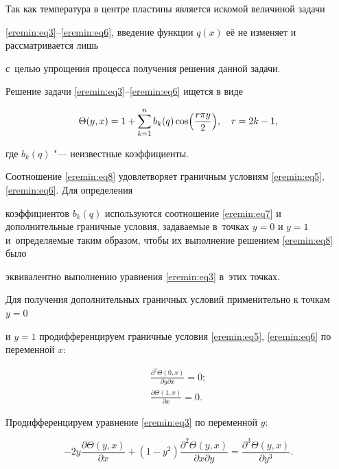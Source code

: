 Так как температура в центре пластины является искомой величиной задачи

\eqref{eremin:eq3}--\eqref{eremin:eq6}, введение функции $q(x)$ её не изменяет и рассматривается лишь

с~целью упрощения процесса получения решения данной задачи.



Решение задачи \eqref{eremin:eq3}--\eqref{eremin:eq6} ищется в виде

\begin{equation}

\label{eremin:eq8}

\Theta (y,x)=1+\sum\limits_{k=1}^n b_k (q)\cos \Bigl(\frac{r\pi y}{2} \Bigr), \quad  r=2k-1,

\end{equation}

где $b_k (q)$ "--- неизвестные коэффициенты.



Соотношение \eqref{eremin:eq8} удовлетворяет граничным условиям \eqref{eremin:eq5}, \eqref{eremin:eq6}. Для определения

коэффициентов $b_k (q)$  используются соотношение \eqref{eremin:eq7} и дополнительные граничные условия, задаваемые в~точках $y=0$ и $y=1$ и~определяемые таким образом, чтобы их выполнение решением \eqref{eremin:eq8} было

эквивалентно выполнению уравнения \eqref{eremin:eq3} в~этих точках.



Для получения дополнительных граничных условий применительно к точкам $y=0$

и $y=1$ продифференцируем граничные условия \eqref{eremin:eq5}, \eqref{eremin:eq6} по переменной $x$:

\begin{gather}

\label{eremin:eq9}

\frac{\partial ^2\Theta (0,  x)}{\partial y\partial

x}=0;\\

\label{eremin:eq10}

\frac{\partial \Theta

(1, x)}{\partial x}=0.

\end{gather}

Продифференцируем уравнение \eqref{eremin:eq3} по переменной $y$:

\begin{equation}

\label{eremin:eq11}

-2y\frac{\partial \Theta (y,x)}{\partial x}+(1-y^2)\frac{\partial ^2\Theta

(y,x)}{\partial x\partial y}=\frac{\partial ^3\Theta (y,x)}{\partial

y^3}.

\end{equation}

